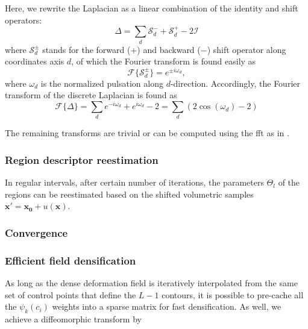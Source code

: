 Here, we rewrite the Laplacian as a linear combination of the identity and shift operators:
\begin{equation}
\Delta = \sum\limits_d \mathcal{S}_d^- + \mathcal{S}_d^+ - 2 \mathcal{I}
\end{equation}
where $\mathcal{S}_{d}^{\pm}$ stands for the forward ($+$) and backward ($-$) shift 
operator along coordinates axis $d$, of which the Fourier transform is found easily as
\begin{equation}
\mathcal{F}\{\mathcal{S}_{d}^{\pm}\} = e^{\pm i\omega_{d}},
\end{equation}
where $\omega_{d}$ is the normalized pulsation along $d$-direction. Accordingly, the 
Fourier transform of the discrete Laplacian is found as
\begin{equation}
\mathcal{F}\{\Delta\} = \sum\limits_d e^{-i\omega_d } + e^{i\omega_d } - 2 = \sum\limits_d \left( 2\cos(\omega_d) - 2 \right)
\end{equation}

The remaining transforms are trivial or can be computed using the \gls{fft} 
as in \citep{estellers_efficient_2011}.

\subsubsection{Region descriptor reestimation}
In regular intervals, after certain number of iterations,
the parameters $\Theta_l$ of the regions can be reestimated 
based on the shifted volumetric samples 
$\mathbf{x}' = \mathbf{x_0} + u(\mathbf{x})$.

\subsubsection{Convergence}

\subsubsection{Efficient field densification}
As long as the dense deformation field is iteratively interpolated
from the same set of control points that define the $L-1$ contours,
it is possible to pre-cache all the $\psi_k(c_i)$ weights into a
sparse matrix for fast densification. As well, we achieve a 
diffeomorphic transform by

